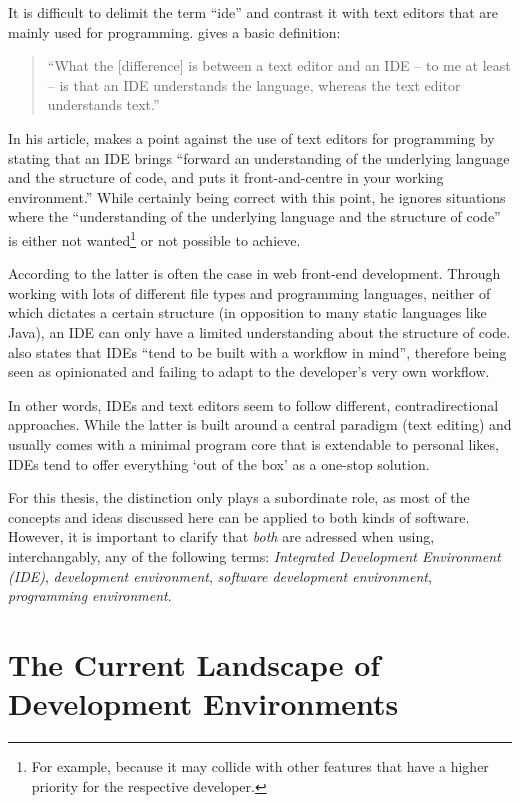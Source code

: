 It is difficult to delimit the term “\acl{ide}” and contrast it with
text editors that are mainly used for programming. 
gives a basic definition:

\begin{quote}
“What the {[}difference{]} is between a text editor and an IDE – to me
at least – is that an IDE understands the language, whereas the text
editor understands text.” \citeyear{reynolds}
\end{quote}

In his article,  makes a point against the use of
text editors for programming by stating that an IDE brings “forward an
understanding of the underlying language and the structure of code, and
puts it front-and-centre in your working environment.”
\citeyear{reynolds} While certainly being correct with this point, he
ignores situations where the “understanding of the underlying language
and the structure of code” is either not
wanted\footnote{For example, because it may collide with other features that have a higher priority for the respective developer.}
or not possible to achieve.

According to  the latter is often the case in web
front-end development. Through working with lots of different file types
and programming languages, neither of which dictates a certain structure
(in opposition to many static languages like Java), an IDE can only have
a limited understanding about the structure of code. 
also states that IDEs “tend to be built with a workflow in mind”,
therefore being seen as opinionated and failing to adapt to the
developer’s very own workflow.

In other words, IDEs and text editors seem to follow different,
contradirectional approaches. While the latter is built around a central
paradigm (text editing) and usually comes with a minimal program core
that is extendable to personal likes, IDEs tend to offer everything ‘out
of the box’ as a one-stop solution.

For this thesis, the distinction only plays a subordinate role, as most
of the concepts and ideas discussed here can be applied to both kinds of
software. However, it is important to clarify that \emph{both} are
adressed when using, interchangably, any of the following terms:
\emph{Integrated Development Environment (IDE)}, \emph{development
environment}, \emph{software development environment}, \emph{programming
environment}.

\section{The Current Landscape of Development
Environments}\label{the-current-landscape-of-development-environments}

